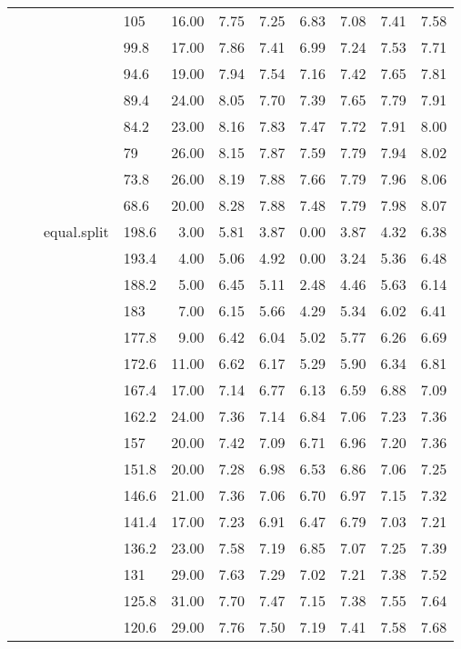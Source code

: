 \begin{longtable}{llllrrrrrrr}
   &  &  & 105 & 16.00 & 7.75 & 7.25 & 6.83 & 7.08 & 7.41 & 7.58 \\ 
   &  &  & 99.8 & 17.00 & 7.86 & 7.41 & 6.99 & 7.24 & 7.53 & 7.71 \\ 
   &  &  & 94.6 & 19.00 & 7.94 & 7.54 & 7.16 & 7.42 & 7.65 & 7.81 \\ 
   &  &  & 89.4 & 24.00 & 8.05 & 7.70 & 7.39 & 7.65 & 7.79 & 7.91 \\ 
   &  &  & 84.2 & 23.00 & 8.16 & 7.83 & 7.47 & 7.72 & 7.91 & 8.00 \\ 
   &  &  & 79 & 26.00 & 8.15 & 7.87 & 7.59 & 7.79 & 7.94 & 8.02 \\ 
   &  &  & 73.8 & 26.00 & 8.19 & 7.88 & 7.66 & 7.79 & 7.96 & 8.06 \\ 
   &  &  & 68.6 & 20.00 & 8.28 & 7.88 & 7.48 & 7.79 & 7.98 & 8.07 \\ 
   &  & equal.split & 198.6 & 3.00 & 5.81 & 3.87 & 0.00 & 3.87 & 4.32 & 6.38 \\ 
   &  &  & 193.4 & 4.00 & 5.06 & 4.92 & 0.00 & 3.24 & 5.36 & 6.48 \\ 
   &  &  & 188.2 & 5.00 & 6.45 & 5.11 & 2.48 & 4.46 & 5.63 & 6.14 \\ 
   &  &  & 183 & 7.00 & 6.15 & 5.66 & 4.29 & 5.34 & 6.02 & 6.41 \\ 
   &  &  & 177.8 & 9.00 & 6.42 & 6.04 & 5.02 & 5.77 & 6.26 & 6.69 \\ 
   &  &  & 172.6 & 11.00 & 6.62 & 6.17 & 5.29 & 5.90 & 6.34 & 6.81 \\ 
   &  &  & 167.4 & 17.00 & 7.14 & 6.77 & 6.13 & 6.59 & 6.88 & 7.09 \\ 
   &  &  & 162.2 & 24.00 & 7.36 & 7.14 & 6.84 & 7.06 & 7.23 & 7.36 \\ 
   &  &  & 157 & 20.00 & 7.42 & 7.09 & 6.71 & 6.96 & 7.20 & 7.36 \\ 
   &  &  & 151.8 & 20.00 & 7.28 & 6.98 & 6.53 & 6.86 & 7.06 & 7.25 \\ 
   &  &  & 146.6 & 21.00 & 7.36 & 7.06 & 6.70 & 6.97 & 7.15 & 7.32 \\ 
   &  &  & 141.4 & 17.00 & 7.23 & 6.91 & 6.47 & 6.79 & 7.03 & 7.21 \\ 
   &  &  & 136.2 & 23.00 & 7.58 & 7.19 & 6.85 & 7.07 & 7.25 & 7.39 \\ 
   &  &  & 131 & 29.00 & 7.63 & 7.29 & 7.02 & 7.21 & 7.38 & 7.52 \\ 
   &  &  & 125.8 & 31.00 & 7.70 & 7.47 & 7.15 & 7.38 & 7.55 & 7.64 \\ 
   &  &  & 120.6 & 29.00 & 7.76 & 7.50 & 7.19 & 7.41 & 7.58 & 7.68 \\ 

\end{longtable}

